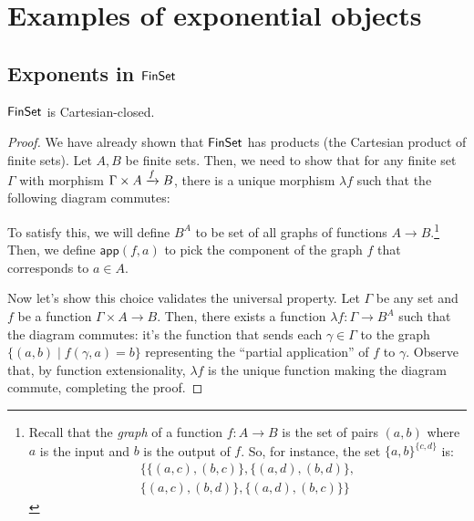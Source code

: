 \section{Examples of exponential objects}

\subsection{Exponents in $\mathsf{FinSet}{}$}

\begin{proposition}
  $\mathsf{FinSet}$ is Cartesian-closed.
\end{proposition}
\begin{proof}
  We have already shown that $\mathsf{FinSet}$ has products (the Cartesian product of
  finite sets). Let $A, B$ be finite sets. Then, we need to show that for 
  any finite set $\Gamma$ with morphism $\Gamma \times A \xrightarrow{f} B$, 
  there is a unique morphism $\lambda f$ such that the following diagram commutes:
  
  \begin{center}
  \end{center}

  To satisfy this, we will define $B^A$ to be set of all graphs of functions $A
  \to B$.\footnote{Recall that the \emph{graph} of a function $f : A \to B$ 
  is the set of pairs $(a, b)$ where $a$ is the input and $b$ is the output 
  of $f$.
  So, for instance, the set $\{a,b\}^{\{c, d\}}$ is:
  \begin{align*}
    \Big\{\{(a, c), (b, c)\}, \{(a, d), (b, d)\}, \\
    \{(a, c), (b, d)\}, \{(a, d), (b, c)\}\Big\}
  \end{align*}
  }
  Then, we define $\mathsf{app}(f, a)$ to pick the component of the 
  graph $f$ that corresponds to $a \in A$. 

  Now let's show this choice validates the universal property.  Let $\Gamma$ be
  any set and $f$ be a function $\Gamma \times A \to B$. Then, there 
  exists a function $\lambda f : \Gamma \to B^A$ such that the diagram commutes:
  it's the function that sends each \(\gamma \in \Gamma\)
  to the graph \(\{(a,b) \mid f(\gamma,a) = b\}\)
  representing the ``partial application'' of \(f\) to \(\gamma\).
  Observe that, by function extensionality, $\lambda f$ is the unique function
  making the diagram commute, completing the proof.
\end{proof}

